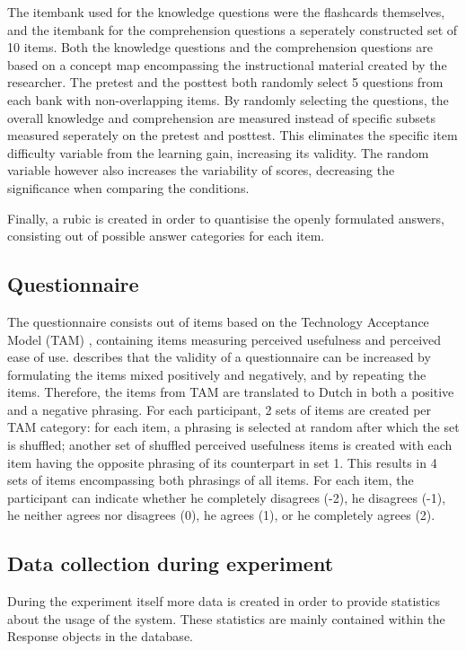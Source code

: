 The itembank used for the knowledge questions were the flashcards themselves, and the itembank for the comprehension questions a seperately constructed set of 10 items. Both the knowledge questions and the comprehension questions are based on a concept map encompassing the instructional material created by the researcher. The pretest and the posttest both randomly select 5 questions from each bank with non-overlapping items. By randomly selecting the questions, the overall knowledge and comprehension are measured instead of specific subsets measured seperately on the pretest and posttest. This eliminates the specific item difficulty variable from the learning gain, increasing its validity. The random variable however also increases the variability of scores, decreasing the significance when comparing the conditions.

Finally, a rubic is created in order to quantisise the openly formulated answers, consisting out of possible answer categories for each item.

\subsection{Questionnaire}

The questionnaire consists out of items based on the Technology Acceptance Model (TAM) \cite{tam}, containing items measuring perceived usefulness and perceived ease of use.  describes that the validity of a questionnaire can be increased by formulating the items mixed positively and negatively, and by repeating the items. Therefore, the items from TAM are translated to Dutch in both a positive and a negative phrasing. For each participant, 2 sets of items are created per TAM category: for each item, a phrasing is selected at random after which the set is shuffled; another set of shuffled perceived usefulness items is created with each item having the opposite phrasing of its counterpart in set 1. This results in 4 sets of items encompassing both phrasings of all items. For each item, the participant can indicate whether he completely disagrees (-2), he disagrees (-1), he neither agrees nor disagrees (0), he agrees (1), or he completely agrees (2).

\subsection{Data collection during experiment}

During the experiment itself more data is created in order to provide statistics about the usage of the system. These statistics are mainly contained within the Response objects in the database.

